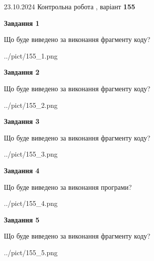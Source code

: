 \documentclass[12pt, ukrainian]{article}
\begin{document}
{\Large{23.10.2024 Контрольна робота , варіант  \No \textbf { 155 }\par}}
{
\begin {large}
{\begin {center}\textbf{Завдання 1}\end {center}}

Що буде виведено за виконання фрагменту коду?\par
\begin{center}
	{../pict/155_1.png}
\end{center}
\newpage

{\begin {center}\textbf{Завдання 2}\end {center}}

Що буде виведено за виконання фрагменту коду?\par
\begin{center}
	{../pict/155_2.png}
\end{center}
\newpage

{\begin {center}\textbf{Завдання 3}\end {center}}

Що буде виведено за виконання фрагменту коду?\par
\begin{center}
	{../pict/155_3.png}
\end{center}
\newpage

{\begin {center}\textbf{Завдання 4}\end {center}}

Що буде виведено за виконання програми?\par
\begin{center}
	{../pict/155_4.png}
\end{center}
\newpage

{\begin {center}\textbf{Завдання 5}\end {center}}

Що буде виведено за виконання фрагменту коду?\par
\begin{center}
	{../pict/155_5.png}
\end{center}
\newpage


\end{large}}
\end{document}
